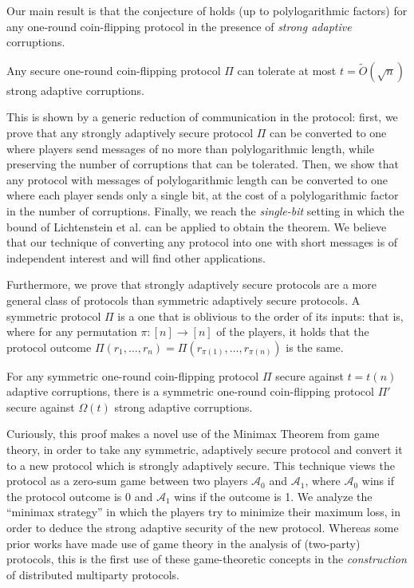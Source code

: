 \documentclass[11pt,letterpaper]{article}
\theoremstyle{plain}
\theoremstyle{definition}
\newenvironment{informalthm}
  {\medskip\noindent{\bf Theorem.}}
  {\medskip}
\newcommand{\Adv}{\mathcal{A}}
\begin{document}
Our main result is that the conjecture of \cite{BL85} holds (up to polylogarithmic factors)
for any one-round coin-flipping protocol in the presence of \emph{strong adaptive} corruptions.

\begin{informalthm}
Any secure one-round coin-flipping protocol $\Pi$ can tolerate at most $t=\widetilde{O}(\sqrt n)$ strong adaptive corruptions.
\end{informalthm}

This is shown by a generic reduction of communication in the protocol: first, we prove that any strongly adaptively secure protocol $\Pi$ can be converted to one
where players send messages of no more than polylogarithmic length, while preserving the number of corruptions that can be tolerated.
Then, we show that any protocol with messages of polylogarithmic length can be converted to one where each player sends only a single bit,
at the cost of a polylogarithmic factor in the number of corruptions.
Finally, we reach the \emph{single-bit} setting in which the bound of Lichtenstein et al. \cite{LLS89} can be applied to obtain the theorem.
We believe that our technique of converting any protocol into one with short messages is of independent interest and will find other applications.

Furthermore, we prove that strongly adaptively secure protocols are a more general class of protocols than symmetric adaptively secure protocols.
A symmetric protocol $\Pi$ is a one that is oblivious to the order of its inputs: that is, where
for any permutation $\pi:[n]\rightarrow[n]$ of the players, it holds that the protocol outcome $\Pi(r_1,\ldots,r_n)=\Pi(r_{\pi(1)},\ldots,r_{\pi(n)})$ is the same.

\begin{informalthm}
For any symmetric one-round coin-flipping protocol $\Pi$ secure against $t=t(n)$ adaptive corruptions,
there is a symmetric one-round coin-flipping protocol $\Pi'$ secure against $\Omega(t)$ strong adaptive corruptions.
\end{informalthm}

Curiously, this proof makes a novel use of the Minimax Theorem \cite{vN44,Nash} from game theory, in order to take any symmetric, adaptively secure protocol and convert it to a new protocol which is strongly adaptively secure. This technique views the protocol as a zero-sum game between two players $\Adv_0$ and $\Adv_1$, where $\Adv_0$
wins if the protocol outcome is 0 and $\Adv_1$ wins if the outcome is 1. 
We analyze the ``minimax strategy'' in which the players try to minimize their maximum loss, in order to deduce the strong adaptive security of the new protocol.
Whereas some prior works have made use of game theory in the analysis of (two-party) protocols,
this is the first use of these game-theoretic concepts in the \emph{construction} of distributed multiparty protocols.
\end{document}
